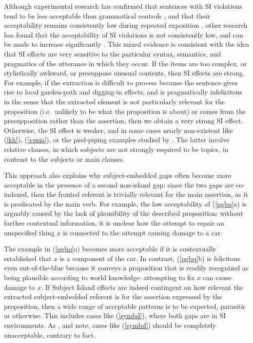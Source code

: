 \documentclass[output=paper
	        ,collection
	        ,collectionchapter
 	        ,biblatex
                ,babelshorthands
                ,newtxmath
                ,draftmode
                ,colorlinks, citecolor=brown
]{langscibook}
\begin{document}
Although experimental research has confirmed that sentences with SI violations tend to be less acceptable than grammatical controls \citep{sprsat2,goodall11,crawfordwccfl,clausencuny,greco}, and that their acceptability
remains consistently low during repeated exposition  \citep{sprsat2,crawfordwccfl}, other research has found that the acceptability of  SI violations is not consistently low, and can be made to increase significantly \citep{hiramatsu00,clausencuny,chavesjeruen,chavessubjexp}. This mixed evidence is consistent with the idea that SI effects are very sensitive to the particular syntax, semantics, and pragmatics of the utterance in which they occur. If the items are too complex, or stylistically awkward, or presuppose unusual contexts, then  
SI effects are  strong.  For example, if the extraction is difficult to process because the sentence gives rise to local  garden-path and digging-in effects, and is pragmatically infelicitous in the sense that the extracted element is not particularly relevant for the proposition (i.e.\ unlikely to be what the proposition is about) or comes from the presupposition rather than the assertion, then we obtain a very strong SI effect. Otherwise, the SI effect is weaker, and in some cases nearly non-existent like (\ref{kh}), (\ref{vpsia}), or 
 the  pied-piping examples studied by \citet{annerels}. The latter involve relative clauses, in which subjects are not strongly required to be topics, in contrast to the subjects or main clauses.

This approach also explains why subject-embedded gaps often become more acceptable in the presence of a second non-island gap: since the two gaps are co-indexed, then the fronted referent is trivially relevant for the main assertion, as it is predicated by the main verb. For example, the low acceptability of (\ref{pgbq}a) is arguably caused  by the lack of   plausibility of the described proposition: without further contextual information, it is unclear how the attempt to repair  an unspecified thing $x$ is connected to the attempt causing  damage to a car. 


\eal   \label{pgbq}
\zl


\noindent
The example in  (\ref{pgbq}a)  becomes more acceptable if it is contextually  established that $x$ is  a component of the car. In contrast, (\ref{pgbq}b) is felicitous even out-of-the-blue because it  conveys a  proposition  that is  readily recognized as being plausible according to world knowledge: attempting to fix $x$ can cause  damage to $x$.  If Subject Island effects are indeed contingent on how relevant the extracted subject-embedded referent is for the assertion expressed by the proposition, then a wide range of acceptable  patterns is to be expected, parasitic or otherwise. This includes cases like  (\ref{symbd}), where both gaps are in SI environments. As \citet{Levine:Sag:03}, \citet[256]{levhubook}  and \citet[161]{Culicover13} note, cases like (\ref{symbd}) should be completely unacceptable, contrary to fact.
\end{document}
